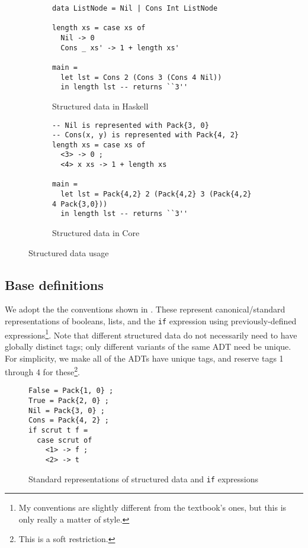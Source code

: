 \begin{figure}
  \begin{subfigure}{\textwidth}
    \begin{verbatim}
data ListNode = Nil | Cons Int ListNode

length xs = case xs of
  Nil -> 0
  Cons _ xs' -> 1 + length xs'

main =
  let lst = Cons 2 (Cons 3 (Cons 4 Nil))
  in length lst -- returns ``3''
    \end{verbatim}
    \caption{Structured data in Haskell}
  \end{subfigure}
  \begin{subfigure}{\textwidth}
    \begin{verbatim}
-- Nil is represented with Pack{3, 0}
-- Cons(x, y) is represented with Pack{4, 2}
length xs = case xs of
  <3> -> 0 ;
  <4> x xs -> 1 + length xs

main =
  let lst = Pack{4,2} 2 (Pack{4,2} 3 (Pack{4,2} 4 Pack{3,0}))
  in length lst -- returns ``3''
    \end{verbatim}
    \caption{Structured data in Core}
  \end{subfigure}
  \caption{Structured data usage}
  \label{fig:structured-data-example}
\end{figure}

\subsection{Base definitions}
\label{sec:core-base}

We adopt the the conventions shown in . These represent canonical/standard representations of booleans, lists, and the \texttt{if} expression using previously-defined expressions\footnote{My conventions are slightly different from the textbook's ones, but this is only really a matter of style.}. Note that different structured data do not necessarily need to have globally distinct tags; only different variants of the same ADT need be unique. For simplicity, we make all of the ADTs have unique tags, and reserve tags 1 through 4 for these\footnote{This is a soft restriction.}.

\begin{figure}
  \centering
  \begin{verbatim}
False = Pack{1, 0} ;
True = Pack{2, 0} ;
Nil = Pack{3, 0} ;
Cons = Pack{4, 2} ;
if scrut t f =
  case scrut of
    <1> -> f ;
    <2> -> t
  \end{verbatim}
  \caption{Standard representations of structured data and \texttt{if} expressions}
  \label{fig:standard-representations}
\end{figure}

